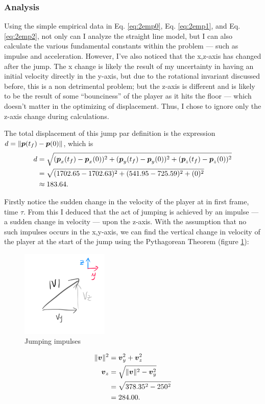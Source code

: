 \subsubsection{Analysis}
Using the simple empirical data in Eq. \ref{eq:2emp0}, Eq. \ref{eq:2emp1}, and Eq. \ref{eq:2emp2}, not only can I analyze the straight line model, but I can also calculate the various fundamental constants within the problem --- such as impulse and acceleration. However, I've also noticed that the x,z-axis has changed after the jump. The x change is likely the result of my uncertainty in having an initial velocity directly in the y-axis, but due to the rotational invariant discussed before, this is a non detrimental problem; but the z-axis is different and is likely to be the result of some ``bounciness'' of the player as it hits the floor --- which doesn't matter in the optimizing of displacement. Thus, I chose to ignore only the z-axis change during calculations.

The total displacement of this jump par definition is the expression $d = \|\boldsymbol{p}(t_f) - \boldsymbol{p}(0)\|$, which is
\begin{align*}
    d &= \sqrt{(\boldsymbol{p}_x(t_f) - \boldsymbol{p}_x(0))^2 + (\boldsymbol{p}_y(t_f) - \boldsymbol{p}_y(0))^2 + (\boldsymbol{p}_z(t_f) - \boldsymbol{p}_z(0))^2}\\
    &= \sqrt{(1702.65-1702.63)^2 + (541.95-725.59)^2 + (0)^2}\\
    &\approx 183.64.
\end{align*}


Firstly notice the sudden change in the velocity of the player at in first frame, time $\tau$. From this I deduced that the act of jumping is achieved by an impulse --- a sudden change in velocity --- upon the z-axis. With the assumption that no such impulses occurs in the x,y-axis, we can find the vertical change in velocity of the player at the start of the jump using the Pythagorean Theorem (figure \ref{fig:2verticalimpulse}):
\begin{figure}
    \includegraphics[width=0.37\textwidth,right]{assets/2verticalimpulse.png}
    \caption{Jumping impulses}
    \label{fig:2verticalimpulse}
\end{figure}
\begin{align*}
    \|\boldsymbol{v}\|^2 &= \boldsymbol{v}_y^2 + \boldsymbol{v}_z^2\\
    \boldsymbol{v}_z &= \sqrt{\|\boldsymbol{v}\|^2 - \boldsymbol{v}_y^2}\\
    &= \sqrt{378.35^2 -250^2}\\
    &= 284.00.
\end{align*}

